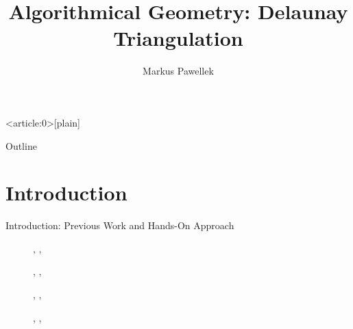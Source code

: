 \documentclass[aspectratio=169]{beamer}
\title{%
  Algorithmical Geometry: Delaunay Triangulation%
}
\author{Markus Pawellek}
\begin{document}

{ %
  \begin{frame}<article:0>[plain]
  \end{frame}
}

\frame{\titlepage}
\begin{frame}{Outline}
  \footnotesize
  \hfill\parbox[t][7cm][l]{0.9\textwidth}{\tableofcontents}
\end{frame}

\section{Introduction}
\begin{frame}{Introduction: Previous Work and Hands-On Approach}
  \begin{description}
    \item[\autocite{shewchuk1996}] \citeauthor{shewchuk1996}, , \citeyear{shewchuk1996}
    \item[\autocite{guibas1985}] \citeauthor{guibas1985}, , \citeyear{guibas1985}
    \item[\autocite{dwyer1987}] \citeauthor{dwyer1987}, , \citeyear{dwyer1987}
    \item[\autocite{lee1980}] \citeauthor{lee1980}, , \citeyear{lee1980}
  \end{description}
\end{frame}
\end{document}
